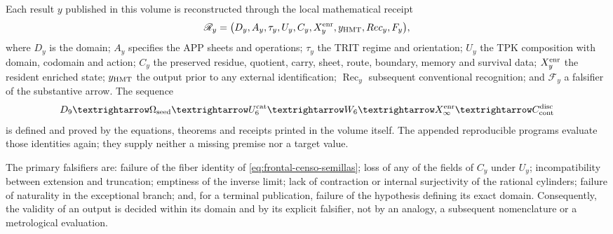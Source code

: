 \begin{proposition}
\label{prop:frontal-autosuficiencia-probatoria}
Each result \(y\) published in this volume is reconstructed through the
local mathematical receipt
\[
 \mathscr R_y=
 \bigl(D_y,A_y,\tau_y,U_y,C_y,X_y^{\rm enr},
       y_{\rm HMT},\operatorname{Rec}_y,\mathcal F_y\bigr),
\]
where \(D_y\) is the domain; \(A_y\) specifies the APP sheets and
operations; \(\tau_y\) the TRIT regime and orientation; \(U_y\) the TPK composition
with domain, codomain and action; \(C_y\) the preserved residue,
quotient, carry, sheet, route, boundary, memory and survival data;
\(X_y^{\rm enr}\) the resident enriched state; \(y_{\rm HMT}\) the
output prior to any external identification; \(\operatorname{Rec}_y\) subsequent
conventional recognition; and \(\mathcal F_y\) a falsifier of the
substantive arrow. The sequence
\[
 \mathcal D_9\longrightarrow\Omega_{\rm seed}
 \longrightarrow\mathcal U_6^{\rm cat}
 \longrightarrow\mathcal W_6
 \longrightarrow X_\infty^{\rm enr}
 \longrightarrow\mathcal C_{\rm cont}^{\rm disc}
\]
is defined and proved by the equations, theorems and receipts printed
in the volume itself. The appended reproducible programs evaluate
those identities again; they supply neither a missing premise nor a target value.

The primary falsifiers are: failure of the fiber identity of
\eqref{eq:frontal-censo-semillas}; loss of any of the fields of
\(C_y\) under \(U_y\); incompatibility between extension and truncation;
emptiness of the inverse limit; lack of contraction or internal surjectivity
of the rational cylinders; failure of naturality in the exceptional
branch; and, for a terminal publication, failure of the
hypothesis defining its exact domain. Consequently, the validity of an
output is decided within its domain and by its explicit falsifier, not by an
analogy, a subsequent nomenclature or a metrological evaluation.
\end{proposition}

